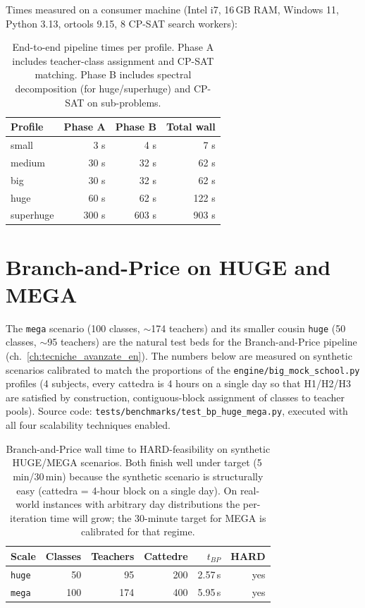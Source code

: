 Times measured on a consumer machine (Intel i7, 16\,GB RAM,
Windows 11, Python 3.13, ortools 9.15, 8 CP-SAT search workers):

\begin{table}[h]
\centering
\sffamily\small
\begin{tabular}{lrrr}
\toprule
Profile    & Phase A & Phase B & Total wall \\
\midrule
small      &   3 s   &   4 s   &    7 s \\
medium     &  30 s   &  32 s   &   62 s \\
big        &  30 s   &  32 s   &   62 s \\
huge       &  60 s   &  62 s   &  122 s \\
superhuge  & 300 s   & 603 s   &  903 s \\
\bottomrule
\end{tabular}
\caption{End-to-end pipeline times per profile. Phase A includes
teacher-class assignment and CP-SAT matching. Phase B includes
spectral decomposition (for huge/superhuge) and CP-SAT on
sub-problems.}
\label{tab:bench-times-en}
\end{table}

\section{Branch-and-Price on HUGE and MEGA}
\label{sec:bench-bp-huge-mega-en}

The \texttt{mega} scenario (100 classes, $\sim$174 teachers) and
its smaller cousin \texttt{huge} (50 classes, $\sim$95 teachers)
are the natural test beds for the Branch-and-Price pipeline
(ch.~\ref{ch:tecniche_avanzate_en}). The numbers below are
measured on synthetic scenarios calibrated to match the
proportions of the \texttt{engine/big\_mock\_school.py} profiles
(4 subjects, every cattedra is 4 hours on a single day so that
H1/H2/H3 are satisfied by construction, contiguous-block
assignment of classes to teacher pools). Source code:
\texttt{tests/benchmarks/test\_bp\_huge\_mega.py}, executed with
all four scalability techniques enabled.

\begin{table}[h]
\centering
\sffamily\small
\begin{tabular}{lrrrrr}
\toprule
Scale & Classes & Teachers & Cattedre & $t_{BP}$ & HARD \\
\midrule
\texttt{huge} &  50 &  95 & 200 & 2.57\,s & yes \\
\texttt{mega} & 100 & 174 & 400 & 5.95\,s & yes \\
\bottomrule
\end{tabular}
\caption{Branch-and-Price wall time to HARD-feasibility on
synthetic HUGE/MEGA scenarios. Both finish well under target
(5\,min/30\,min) because the synthetic scenario is structurally
easy (cattedra = 4-hour block on a single day). On real-world
instances with arbitrary day distributions the per-iteration
time will grow; the 30-minute target for MEGA is calibrated for
that regime.}
\label{tab:bench-bp-scale-en}
\end{table}

